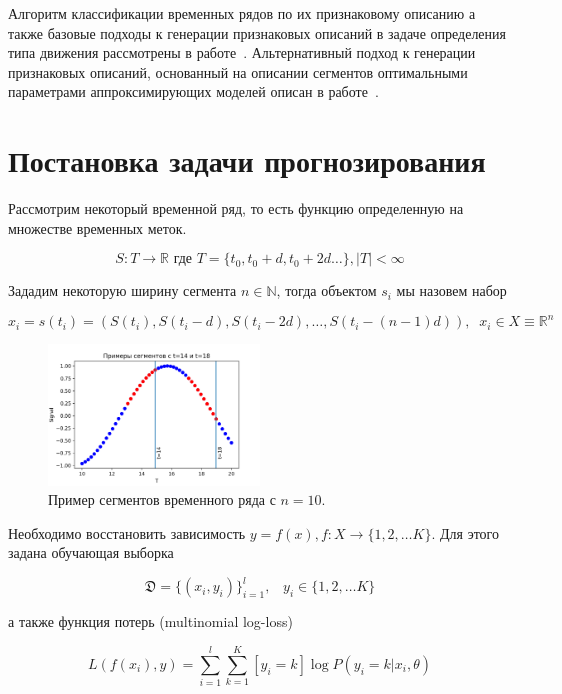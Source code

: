 \documentclass[12pt, fleqn, unicode]{article}
\newcommand{\R}{\mathbb{R}}
\newcommand{\N}{\mathbb{N}}
\begin{document}
Алгоритм классификации временных рядов по их признаковому описанию а также
базовые подходы к генерации признаковых описаний в
 задаче определения типа движения рассмотрены в работе~\cite{Kuznetsov2015}.
Альтернативный подход к генерации признаковых описаний, основанный на описании
сегментов оптимальными параметрами аппроксимирующих моделей описан в
работе~\cite{Karasikov2016}.

\newpage
\section{Постановка задачи прогнозирования}

Рассмотрим некоторый временной ряд, то есть функцию определенную на множестве
временных меток.

$$
S: T \to \R \text{ где } T = \{t_0, t_0 + d, t_0 + 2d \ldots\}, |T| < \infty
$$

Зададим некоторую ширину сегмента $n \in \N$, тогда объектом $s_i$ мы
назовем набор

$$
x_i = s(t_i) = (S(t_i), S(t_i - d), S(t_i - 2d), \ldots, S(t_i - (n - 1)d)),
\;\; x_i \in X \equiv \R^n
$$

\begin{figure}[ht]
    \caption{Пример сегментов временного ряда с $n=10$.}
    \centering
      \includegraphics[width=0.5\textwidth]{../pics/segment_def.png}
\end{figure}

Необходимо восстановить зависимость $y = f(x), f: X \to \{1, 2, \ldots K\}$.
Для этого задана обучающая выборка

$$
\mathfrak{D} = \{ (x_i, y_i) \}_{i=1}^l, \;\;\; y_i \in \{1, 2, \ldots K\}
$$

а также функция потерь (multinomial log-loss)

\begin{equation} \label{init-logloss}
L(f(x_i), y) = \sum_{i=1}^l\sum_{k=1}^K [y_i = k]\log P(y_i = k| x_i, \theta)
\end{equation}
\end{document}
